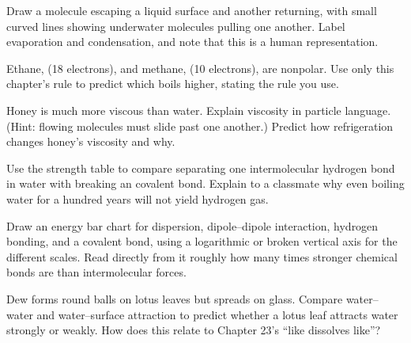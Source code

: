 \begin{sikaoti}
\item Draw a molecule escaping a liquid surface and another returning, with small curved lines showing underwater molecules pulling one another. Label evaporation and condensation, and note that this is a human representation.
\item Ethane,  (18 electrons), and methane,  (10 electrons), are nonpolar. Use only this chapter's rule to predict which boils higher, stating the rule you use.
\item Honey is much more viscous than water. Explain viscosity in particle language. (Hint: flowing molecules must slide past one another.) Predict how refrigeration changes honey's viscosity and why.
\item Use the strength table to compare separating one intermolecular hydrogen bond in water with breaking an  covalent bond. Explain to a classmate why even boiling water for a hundred years will not yield hydrogen gas.
\item Draw an energy bar chart for dispersion, dipole--dipole interaction, hydrogen bonding, and a  covalent bond, using a logarithmic or broken vertical axis for the different scales. Read directly from it roughly how many times stronger chemical bonds are than intermolecular forces.
\item Dew forms round balls on lotus leaves but spreads on glass. Compare water--water and water--surface attraction to predict whether a lotus leaf attracts water strongly or weakly. How does this relate to Chapter 23's ``like dissolves like''?
\end{sikaoti}
